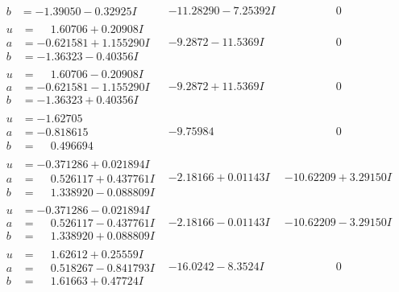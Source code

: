 \documentclass[1p]{elsarticle_modified}
\theoremstyle{definition}
\begin{document}
$$\begin{array}{c|c|c}
\begin{aligned}
b &= -1.39050 - 0.32925 I\end{aligned}
 & -11.28290 - 7.25392 I & \phantom{-0.000000 } 0 \\ \hline\begin{aligned}
u &= \phantom{-}1.60706 + 0.20908 I \\
a &= -0.621581 + 1.155290 I \\
b &= -1.36323 - 0.40356 I\end{aligned}
 & -9.2872 - 11.5369 I & \phantom{-0.000000 } 0 \\ \hline\begin{aligned}
u &= \phantom{-}1.60706 - 0.20908 I \\
a &= -0.621581 - 1.155290 I \\
b &= -1.36323 + 0.40356 I\end{aligned}
 & -9.2872 + 11.5369 I & \phantom{-0.000000 } 0 \\ \hline\begin{aligned}
u &= -1.62705\phantom{ +0.000000I} \\
a &= -0.818615\phantom{ +0.000000I} \\
b &= \phantom{-}0.496694\phantom{ +0.000000I}\end{aligned}
 & -9.75984\phantom{ +0.000000I} & \phantom{-0.000000 } 0 \\ \hline\begin{aligned}
u &= -0.371286 + 0.021894 I \\
a &= \phantom{-}0.526117 + 0.437761 I \\
b &= \phantom{-}1.338920 - 0.088809 I\end{aligned}
 & -2.18166 + 0.01143 I & -10.62209 + 3.29150 I \\ \hline\begin{aligned}
u &= -0.371286 - 0.021894 I \\
a &= \phantom{-}0.526117 - 0.437761 I \\
b &= \phantom{-}1.338920 + 0.088809 I\end{aligned}
 & -2.18166 - 0.01143 I & -10.62209 - 3.29150 I \\ \hline\begin{aligned}
u &= \phantom{-}1.62612 + 0.25559 I \\
a &= \phantom{-}0.518267 - 0.841793 I \\
b &= \phantom{-}1.61663 + 0.47724 I\end{aligned}
 & -16.0242 - 8.3524 I & \phantom{-0.000000 } 0 \\ \hline\begin{aligned}

\end{aligned}
\end{array}$$
\end{document}
